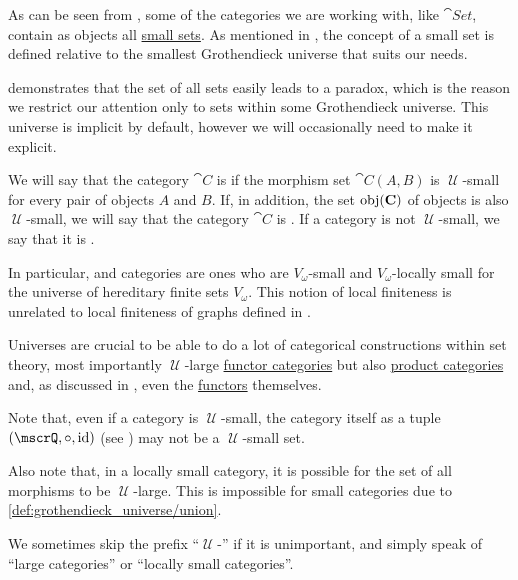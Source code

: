 \begin{definition}\label{def:category_size}
  As can be seen from , some of the categories we are working with, like \( \cat{Set} \), contain as objects all \hyperref[def:large_and_small_sets]{small sets}. As mentioned in , the concept of a small set is defined relative to the smallest Grothendieck universe that suits our needs.

   demonstrates that the set of all sets easily leads to a paradox, which is the reason we restrict our attention only to sets within some Grothendieck universe. This universe is implicit by default, however we will occasionally need to make it explicit.

  We will say that the category \( \cat{C} \) is  if the morphism set \( \cat{C}(A, B) \) is \( \mscrU \)-small for every pair of objects \( A \) and \( B \). If, in addition, the set \( \operatorname{obj}(\operatorname{\mathbf{C}}) \) of objects is also \( \mscrU \)-small, we will say that the category \( \cat{C} \) is . If a category is not \( \mscrU \)-small, we say that it is .

  In particular,  and  categories are ones who are \( V_\omega \)-small and \( V_\omega \)-locally small for the universe of hereditary finite sets \hyperref[def:universe_of_hereditary_finite_sets]{\( V_\omega \)}. This notion of local finiteness is unrelated to local finiteness of graphs defined in .

  Universes are crucial to be able to do a lot of categorical constructions within set theory, most importantly \( \mscrU \)-large \hyperref[def:functor_category]{functor categories} but also \hyperref[def:product_category]{product categories} and, as discussed in , even the \hyperref[def:functors]{functors} themselves.

  Note that, even if a category is \( \mscrU \)-small, the category itself as a tuple \( (\mscrQ, \bincirc, \id) \) (see ) may not be a \( \mscrU \)-small set.

  Also note that, in a locally small category, it is possible for the set of all morphisms to be \( \mscrU \)-large. This is impossible for small categories due to \ref{def:grothendieck_universe/union}.

  We sometimes skip the prefix \enquote{\( \mscrU \)-} if it is unimportant, and simply speak of \enquote{large categories} or \enquote{locally small categories}.
\end{definition}

